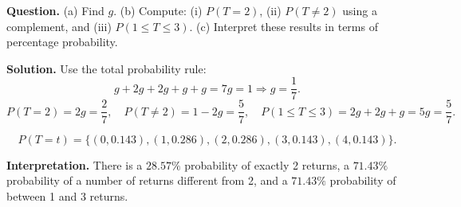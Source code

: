 \begin{ExamProblems}
		\textbf{Question.}
		(a) Find $g$.
		(b) Compute: (i) $P(T=2)$, (ii) $P(T\ne 2)$ using a complement, and (iii) $P(1\le T\le 3)$.
		(c) Interpret these results in terms of percentage probability.
		
		\textbf{Solution.}
		Use the total probability rule:
		\[
		g+2g+2g+g+g=7g=1\Rightarrow g=\frac{1}{7}.
		\]
		\[
		P(T=2)=2g=\frac{2}{7},\quad
		P(T\ne 2)=1-2g=\frac{5}{7},\quad
		P(1\le T\le 3)=2g+2g+g=5g=\frac{5}{7}.
		\]
		
\[
		P(T=t)=\{(0,0.143),(1,0.286),(2,0.286),(3,0.143),(4,0.143)\}.
		\]
\begin{center}
		\end{center}
\textbf{Interpretation.} There is a $28.57\%$ probability of exactly 2 returns, a $71.43\%$ probability of a number of returns different from 2, and a $71.43\%$ probability of between 1 and 3 returns.
		
	\end{ExamProblems}
	

